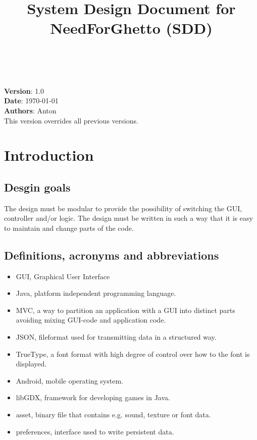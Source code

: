 \documentclass{article}
\begin{document}
\title{System Design Document for NeedForGhetto (SDD)}
\author{}
\date{}
\maketitle

\tableofcontents

\noindent
\\
\\
\textbf{Version}: 1.0 \\
\textbf{Date}: \today \\
\textbf{Authors}: Anton \\
This version overrides all previous versions.

\section{Introduction}
\subsection{Desgin goals}
The design must be modular to provide the possibility of switching the GUI, controller and/or logic. The design must be written in such a way that it is easy to maintain and change parts of the code.
 
\subsection{Definitions, acronyms and abbreviations}
\begin{itemize}
  \item GUI, Graphical User Interface
  \item Java, platform independent programming language.
  \item MVC, a way to partition an application with a GUI into distinct parts avoiding
  mixing GUI-code and application code.
  \item JSON, fileformat used for transmitting data in a structured way.
  \item TrueType, a font format with high degree of control over how to the font is displayed.
  \item Android, mobile operating system. 
  \item libGDX, framework for developing games in Java.
  \item asset, binary file that contains e.g. sound, texture or font data.
  \item preferences, interface used to write persistent data.
\end{itemize}
\end{document}
